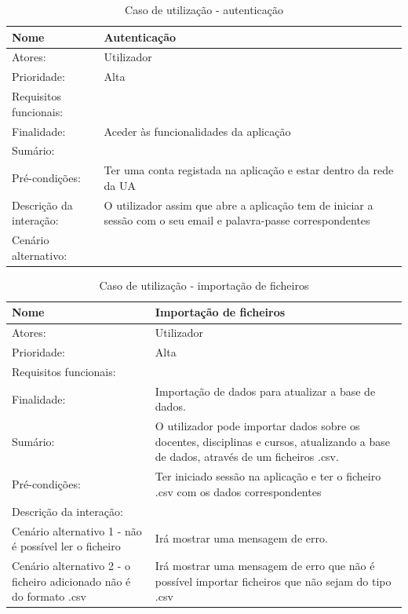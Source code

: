 \documentclass[11pt, twoside]{report}
\begin{document}
	\begin{table}[H]
		\caption{Caso de utilização - autenticação}
		\begin{center}	
			\begin{tabularx}{\textwidth}{|l|X|}
				\hline
				\textbf{Nome }	& \textbf{Autenticação} \\
				\hline
				Atores: & Utilizador \\
				\hline
				Prioridade: & Alta \\
				\hline
				Requisitos funcionais:&  \\
				\hline
				Finalidade: & Aceder às funcionalidades da aplicação\\
				\hline
				Sumário: &  \\
				\hline
				Pré-condições: & Ter uma conta registada na aplicação e estar dentro da rede da UA\\
				\hline
				Descrição da interação: &  O utilizador assim que abre a aplicação tem de iniciar a sessão com o seu email e palavra-passe correspondentes\\
				\hline
				Cenário alternativo:&\\
				\hline
			\end{tabularx}
		\end{center}
	\end{table}

	
\begin{table}[H]
	\caption{Caso de utilização - importação de ficheiros}
	\begin{center}	
		\begin{tabularx}{\textwidth}{|X|X|}
			\hline
			\textbf{Nome }	& \textbf{Importação de ficheiros}\\
			\hline
			Atores: & Utilizador\\
			\hline
			Prioridade: &  Alta\\
			\hline
			Requisitos funcionais:&  \\
			\hline
			Finalidade: &  Importação de dados para atualizar a base de dados.\\
			\hline
			Sumário: &O utilizador pode importar dados sobre os docentes, disciplinas e cursos, atualizando a base de dados, através de um ficheiros .csv. \\
			\hline
			Pré-condições: & Ter iniciado sessão na aplicação e ter o ficheiro .csv com os dados correspondentes\\
			\hline
			Descrição da interação: &  \\
			\hline
			Cenário alternativo 1 - não é possível ler o ficheiro &Irá mostrar uma mensagem de erro.\\
			\hline
			Cenário alternativo 2 - o ficheiro adicionado não é do formato .csv &Irá mostrar uma mensagem de erro que não é possível importar ficheiros que não sejam do tipo .csv\\
			\hline
		\end{tabularx}
	\end{center}
\end{table}
\end{document}
